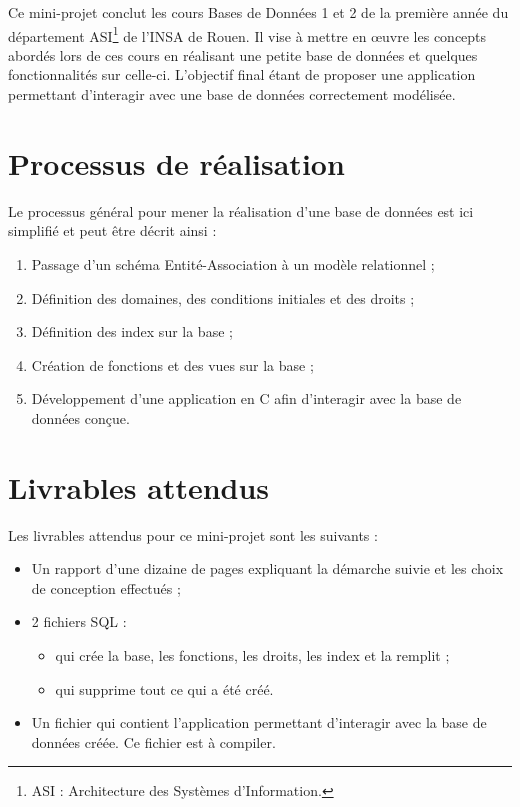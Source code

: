 Ce mini-projet conclut les cours Bases de Données 1 et 2 de la première année du département ASI\footnote{ASI : Architecture des Systèmes d'Information.} de l'INSA de Rouen. Il vise à mettre en œuvre les concepts abordés lors de ces cours en réalisant une petite base de données et quelques fonctionnalités sur celle-ci. L'objectif final étant de proposer une application permettant d'interagir avec une base de données correctement modélisée.\\

\section{Processus de réalisation}
Le processus général pour mener la réalisation d'une base de données est ici simplifié et peut être décrit ainsi :
\begin{enumerate}[leftmargin=2cm]
	\item Passage d'un schéma Entité-Association à un modèle relationnel ;
	\item Définition des domaines, des conditions initiales et des droits ;
	\item Définition des index sur la base ;
	\item Création de fonctions et des vues sur la base ;
	\item Développement d'une application en C afin d'interagir avec la base de données conçue. 
\end{enumerate}

\section{Livrables attendus}
Les livrables attendus pour ce mini-projet sont les suivants :
\begin{itemize}
	\item Un rapport d'une dizaine de pages expliquant la démarche suivie et les choix de conception effectués ;
	\item 2 fichiers SQL : 
		\begin{itemize}
			\item {} qui crée la base, les fonctions, les droits, les index et la remplit ;
			\item {} qui supprime tout ce qui a été créé.
		\end{itemize}
	\item Un fichier  qui contient l'application permettant d'interagir avec la base de données créée. Ce fichier est à compiler.
\end{itemize}